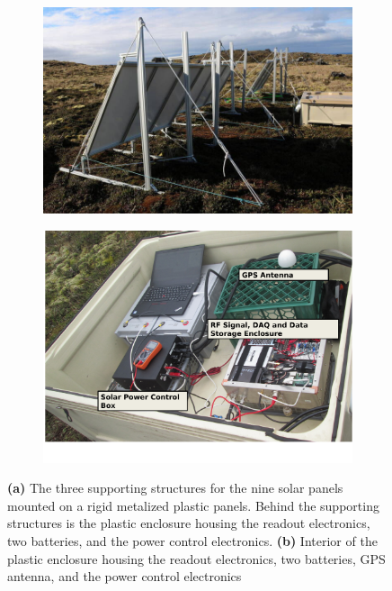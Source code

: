 \begin{figure}
	\centering
	\begin{subfigure}[t]{0.52\textwidth}
		\centering
		\includegraphics[width=\linewidth]{Figures/40916139043_f3d0c6b013_o} 
		\caption{} \label{Fig:40916139043_f3d0c6b013_o}
	\end{subfigure}
	\hfill
	\begin{subfigure}[t]{0.46\textwidth}
		\centering
		\includegraphics[width=\linewidth]{Figures/bin}
		\caption{} \label{Fig:bin}
	\end{subfigure}
	\caption{{\bf (a)} The three supporting structures for the nine solar panels mounted on a rigid metalized plastic panels. Behind the supporting structures is the plastic enclosure housing the readout electronics, two batteries, and the power control electronics. {\bf (b)} Interior of the  plastic enclosure housing the readout electronics, two batteries, GPS antenna, and the power control electronics} \label{Fig:power}
\end{figure}

